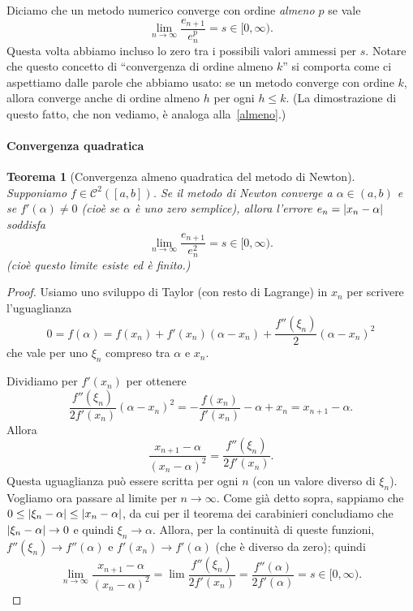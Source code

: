 \documentclass[a4paper]{report}
\DeclarePairedDelimiter{\abs}{\lvert}{\rvert}
\newtheorem{theorem}{Teorema}[chapter]
\theoremstyle{definiton}
\theoremstyle{remark}
\begin{document}
Diciamo che un metodo numerico converge con ordine \emph{almeno $p$} se vale
\[
\lim_{n \to \infty }\frac{e_{n+1}}{e_n^p} = s \in [0,\infty).
\]
Questa volta abbiamo incluso lo zero tra i possibili valori ammessi per $s$. Notare che questo concetto di ``convergenza di ordine almeno $k$'' si comporta come ci aspettiamo dalle parole che abbiamo usato: se un metodo converge con ordine $k$, allora converge anche di ordine almeno $h$ per ogni $h\leq k$. (La dimostrazione di questo fatto, che non vediamo, è analoga alla~\eqref{almeno}.)

\paragraph{Convergenza quadratica} \begin{theorem}[Convergenza almeno quadratica del metodo di Newton] \label{thm:convnewton}
Supponiamo $f \in \mathcal{C}^2([a,b])$. Se il metodo di Newton converge a $\alpha \in (a,b)$ e se $f'(\alpha) \neq 0$ (cioè se $\alpha$ è uno \emph{zero semplice}), allora l'errore $e_n = \abs{x_n - \alpha}$ soddisfa
\[
\lim_{n\to \infty} \frac{e_{n+1}}{e_n^2} = s \in [0,\infty).
\]
(cioè questo limite esiste ed è finito.)
\end{theorem}

\begin{proof}
Usiamo uno sviluppo di Taylor (con resto di Lagrange) in $x_n$ per scrivere l'uguaglianza
\[
0 = f(\alpha) = f(x_n) + f'(x_n)(\alpha-x_n) + \frac{f''(\xi_n)}{2}(\alpha-x_n)^2
\]
che vale per uno $\xi_n$ compreso tra $\alpha$ e $x_n$.

Dividiamo per $f'(x_n)$ per ottenere
\[
\frac{f''(\xi_n)}{2f'(x_n)}(\alpha-x_n)^2 = - \frac{f(x_n)}{f'(x_n)} - \alpha + x_n   =  x_{n+1} - \alpha.
\]
Allora
\[
\frac{x_{n+1} - \alpha}{(x_n-\alpha)^2} = \frac{f''(\xi_n)}{2f'(x_n)}.
\]
Questa uguaglianza può essere scritta per ogni $n$ (con un valore diverso di $\xi_n$). Vogliamo ora passare al limite per $n \to \infty$. Come già detto sopra, sappiamo che $0 \leq \abs{\xi_n - \alpha} \leq \abs{x_n - \alpha}$, da cui per il teorema dei carabinieri concludiamo che $\abs{\xi_n - \alpha} \to 0$ e quindi $\xi_n \to \alpha$. Allora, per la continuità di queste funzioni, $f''(\xi_n) \to f''(\alpha)$ e $f'(x_n) \to f'(\alpha)$ (che è diverso da zero); quindi
\[
\lim_{n\to\infty} \frac{x_{n+1} - \alpha}{(x_n-\alpha)^2} = \lim \frac{f''(\xi_n)}{2f'(x_n)} = \frac{f''(\alpha)}{2f'(\alpha)} = s \in [0,\infty).
\]
\end{proof}
\end{document}
